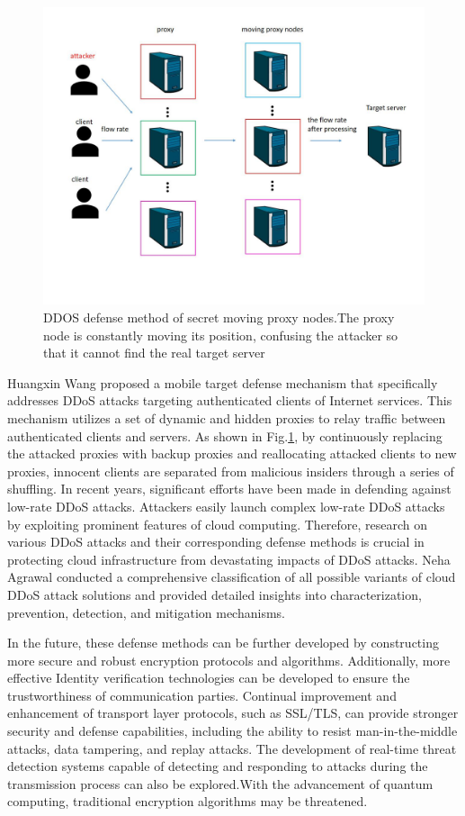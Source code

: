 \documentclass[conference]{IEEEtran}
\begin{document}
\begin{figure}[htbp]
    \centerline{\includegraphics[width=0.8\linewidth,height=0.6\linewidth]{picture/de-ddos.jpg}}
    \caption{DDOS defense method of secret moving proxy nodes.The proxy node is constantly moving its position, confusing the attacker so that it cannot find the real target server}
    \label{fig16}
\end{figure}

Huangxin Wang \cite{b131} proposed a mobile target defense mechanism that specifically addresses DDoS
attacks targeting authenticated clients of Internet services.
This mechanism utilizes a set of dynamic and hidden proxies to relay
traffic between authenticated clients and servers. As shown in Fig.\ref{fig16}, by continuously
replacing the attacked proxies with backup proxies and reallocating attacked clients to new proxies,
innocent clients are separated from malicious insiders through a series of shuffling.
In recent years, significant efforts have been made in defending against
low-rate DDoS attacks. Attackers easily launch complex low-rate
DDoS attacks by exploiting prominent features of cloud computing.
Therefore, research on various DDoS attacks and their corresponding defense
methods is crucial in protecting cloud infrastructure from devastating impacts
of DDoS attacks. Neha Agrawal \cite{b132} conducted a comprehensive classification
of all possible variants of cloud DDoS attack solutions and provided detailed insights
into characterization, prevention, detection, and mitigation mechanisms.

In the future, these defense methods can be further developed by constructing more secure and
robust encryption protocols and algorithms. Additionally, more effective Identity verification 
technologies can be developed to ensure the trustworthiness of communication parties. Continual 
improvement and enhancement of transport layer protocols, such as SSL/TLS, can provide stronger 
security and defense capabilities, including the ability to resist man-in-the-middle attacks, 
data tampering, and replay attacks. The development of real-time threat detection systems capable 
of detecting and responding to attacks during the transmission process can also be explored.With 
the advancement of quantum computing, traditional encryption algorithms may be threatened. 
\end{document}
